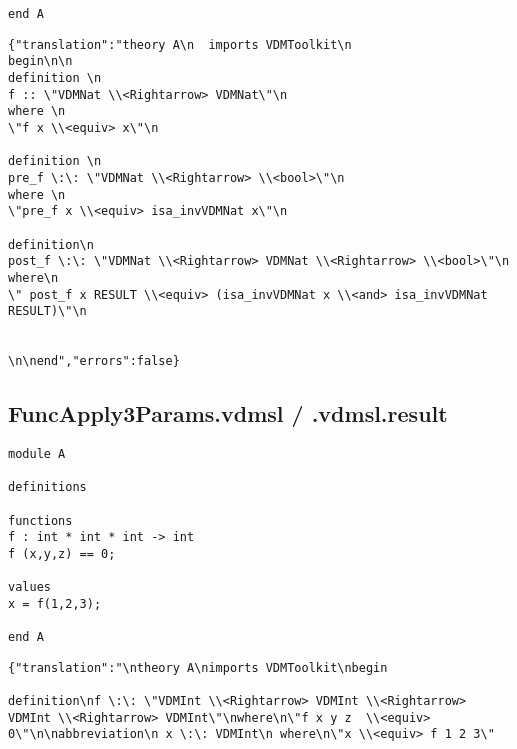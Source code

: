 \begin{appendices}
\begin{lstlisting}
end A
\end{lstlisting}
\hfill\break
\begin{lstlisting}
{"translation":"theory A\n  imports VDMToolkit\n
begin\n\n
definition \n
f :: \"VDMNat \\<Rightarrow> VDMNat\"\n
where \n
\"f x \\<equiv> x\"\n

definition \n
pre_f \:\: \"VDMNat \\<Rightarrow> \\<bool>\"\n
where \n
\"pre_f x \\<equiv> isa_invVDMNat x\"\n

definition\n
post_f \:\: \"VDMNat \\<Rightarrow> VDMNat \\<Rightarrow> \\<bool>\"\n
where\n
\" post_f x RESULT \\<equiv> (isa_invVDMNat x \\<and> isa_invVDMNat RESULT)\"\n

 
\n\nend","errors":false}
\end{lstlisting}

\subsection{FuncApply3Params.vdmsl / .vdmsl.result}
\begin{lstlisting}
module A

definitions

functions
f : int * int * int -> int
f (x,y,z) == 0;

values
x = f(1,2,3);

end A
\end{lstlisting}

\begin{lstlisting}
{"translation":"\ntheory A\nimports VDMToolkit\nbegin

definition\nf \:\: \"VDMInt \\<Rightarrow> VDMInt \\<Rightarrow> VDMInt \\<Rightarrow> VDMInt\"\nwhere\n\"f x y z  \\<equiv> 0\"\n\nabbreviation\n x \:\: VDMInt\n where\n\"x \\<equiv> f 1 2 3\"


\end{lstlisting}
\end{appendices}
